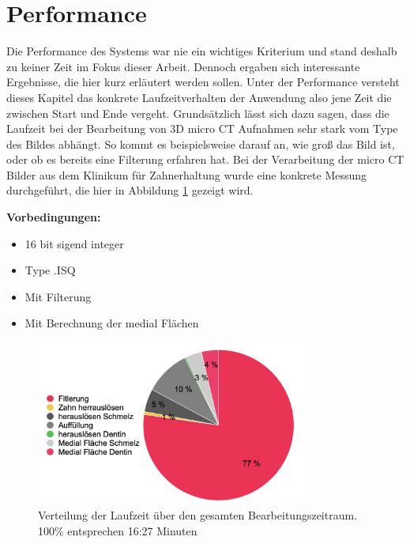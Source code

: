 \section{Performance}
Die Performance des Systems war nie ein wichtiges Kriterium und stand deshalb zu
keiner Zeit im Fokus dieser Arbeit. Dennoch ergaben sich interessante Ergebnisse,
die hier kurz erläutert werden sollen. Unter der Performance versteht dieses Kapitel
das konkrete Laufzeitverhalten der Anwendung also jene Zeit die zwischen Start und
Ende vergeht. Grundsätzlich lässt sich dazu sagen, dass die Laufzeit bei der Bearbeitung
von 3D micro CT Aufnahmen sehr stark vom Type des Bildes abhängt. So kommt es
beispielsweise darauf an, wie groß das Bild ist, oder ob es bereits eine
Filterung erfahren hat. Bei der Verarbeitung der micro CT Bilder aus dem Klinikum
für Zahnerhaltung wurde eine konkrete Messung durchgeführt, die hier in
Abbildung \ref{fig:laufzeit} gezeigt wird.

\textbf{Vorbedingungen:}
\begin{itemize}
	\item 16 bit sigend integer

	\item Type .ISQ

	\item Mit Filterung

	\item Mit Berechnung der medial Flächen
\end{itemize}

\begin{figure}[h]
	\centering
	\includegraphics[width=0.8\textwidth]{img/laufzeit_diagramm.png}
	\caption{Verteilung der Laufzeit über den gesamten Bearbeitungszeitraum. 100\%
	entsprechen 16:27 Minuten}
	\label{fig:laufzeit}
\end{figure}

